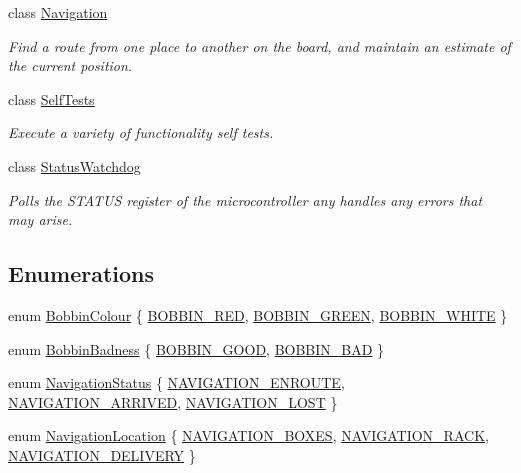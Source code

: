 \begin{DoxyCompactItemize}
class \hyperlink{classIDP_1_1Navigation}{Navigation}
\begin{DoxyCompactList}\small\item\em Find a route from one place to another on the board, and maintain an estimate of the current position. \item\end{DoxyCompactList}\item 
class \hyperlink{classIDP_1_1SelfTests}{SelfTests}
\begin{DoxyCompactList}\small\item\em Execute a variety of functionality self tests. \item\end{DoxyCompactList}\item 
class \hyperlink{classIDP_1_1StatusWatchdog}{StatusWatchdog}
\begin{DoxyCompactList}\small\item\em Polls the STATUS register of the microcontroller any handles any errors that may arise. \item\end{DoxyCompactList}\end{DoxyCompactItemize}
\subsection*{Enumerations}
\begin{DoxyCompactItemize}
\item 
enum \hyperlink{namespaceIDP_a6efd2cca14c0dae1c6458714ce0218df}{BobbinColour} \{ \hyperlink{namespaceIDP_a6efd2cca14c0dae1c6458714ce0218dfa1bbb59488c1d089eefb9b54146bcdb26}{BOBBIN\_\-RED}, 
\hyperlink{namespaceIDP_a6efd2cca14c0dae1c6458714ce0218dfa047d7c5fcd5669f1a819d05fb5319f0b}{BOBBIN\_\-GREEN}, 
\hyperlink{namespaceIDP_a6efd2cca14c0dae1c6458714ce0218dfa8f427bfb1c335650a7ada595e1607d00}{BOBBIN\_\-WHITE}
 \}
\item 
enum \hyperlink{namespaceIDP_adf12b2c1e1c228810b18c34a3c88c32d}{BobbinBadness} \{ \hyperlink{namespaceIDP_adf12b2c1e1c228810b18c34a3c88c32dafdc1b8b5a9d849fd99ac2ae438b632dd}{BOBBIN\_\-GOOD}, 
\hyperlink{namespaceIDP_adf12b2c1e1c228810b18c34a3c88c32da6cb4993a316e9d4dc9836d3d990fd0f6}{BOBBIN\_\-BAD}
 \}
\item 
enum \hyperlink{namespaceIDP_a1a96e566e4d675fdf20780cc96d92283}{NavigationStatus} \{ \hyperlink{namespaceIDP_a1a96e566e4d675fdf20780cc96d92283a9f52fe7970aefcb1b74e9aea3798f39d}{NAVIGATION\_\-ENROUTE}, 
\hyperlink{namespaceIDP_a1a96e566e4d675fdf20780cc96d92283ab9e83c995cb23a5782b23b198dcbabcb}{NAVIGATION\_\-ARRIVED}, 
\hyperlink{namespaceIDP_a1a96e566e4d675fdf20780cc96d92283ad75d1c5522e0a38dbe62266912d411ba}{NAVIGATION\_\-LOST}
 \}
\item 
enum \hyperlink{namespaceIDP_ab9c412f0fd539b5d70385066c30465a0}{NavigationLocation} \{ \hyperlink{namespaceIDP_ab9c412f0fd539b5d70385066c30465a0a0cfb642ce5e4133706998843eb3c8da1}{NAVIGATION\_\-BOXES}, 
\hyperlink{namespaceIDP_ab9c412f0fd539b5d70385066c30465a0af1bde0912725a75705d0fb74637f20c1}{NAVIGATION\_\-RACK}, 
\hyperlink{namespaceIDP_ab9c412f0fd539b5d70385066c30465a0a10e09a3f2969d951f0dc233cb76eb4bf}{NAVIGATION\_\-DELIVERY}
 \}
\end{DoxyCompactItemize}
